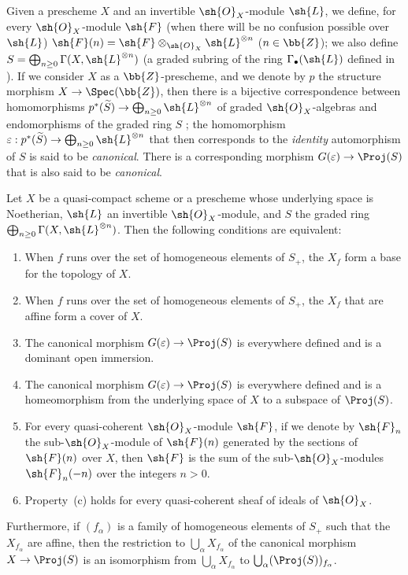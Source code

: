 \begin{env}[4.5.1]
\label{II.4.5.1}
Given a prescheme $X$ and an invertible $\sh{O}_X$-module $\sh{L}$, we define, for every $\sh{O}_X$-module $\sh{F}$ (when there will be no confusion possible over $\sh{L}$) $\sh{F}(n)=\sh{F}\otimes_{\sh{O}_X}\sh{L}^{\otimes n}$ ($n\in\bb{Z}$);
we also define $S=\bigoplus_{n\geq0}\Gamma(X,\sh{L}^{\otimes n})$ (a graded subring of the ring $\Gamma_\bullet(\sh{L})$ defined in ).
If we consider $X$ as a $\bb{Z}$-prescheme, and we denote by $p$ the structure morphism $X\to\Spec(\bb{Z})$, then there is a bijective correspondence between homomorphisms $p^*(\widetilde{S})\to\bigoplus_{n\geq0}\sh{L}^{\otimes n}$ of graded $\sh{O}_X$-algebras and endomorphisms of the graded ring $S$ ;
the homomorphism $\varepsilon:p^*(\widetilde{S})\to\bigoplus_{n\geq0}\sh{L}^{\otimes n}$ that then corresponds to the \emph{identity} automorphism of $S$ is said to be \emph{canonical}.
There is a corresponding  morphism $G(\varepsilon)\to\Proj(S)$ that is also said to be \emph{canonical}.
\end{env}

\begin{theorem}[4.5.2]
\label{II.4.5.2}
Let $X$ be a quasi-compact scheme or a prescheme whose underlying space is Noetherian, $\sh{L}$ an invertible $\sh{O}_X$-module, and $S$ the graded ring $\bigoplus_{n\geq0}\Gamma(X,\sh{L}^{\otimes n})$.
Then the following conditions are equivalent:
\begin{enumerate}
  \item[\rm{(a)}] When $f$ runs over the set of homogeneous elements of $S_+$, the $X_f$ form a base for the topology of $X$.
  \item[\rm{(a')}] When $f$ runs over the set of homogeneous elements of $S_+$, the $X_f$ that are affine form a cover of $X$.
  \item[\rm{(b)}] The canonical morphism $G(\varepsilon)\to\Proj(S)$  is everywhere defined and is a dominant open immersion.
  \item[\rm{(b')}] The canonical morphism $G(\varepsilon)\to\Proj(S)$ is everywhere defined and is a homeomorphism from the underlying space of $X$ to a subspace of $\Proj(S)$.
  \item[\rm{(c)}] For every quasi-coherent $\sh{O}_X$-module $\sh{F}$, if we denote by $\sh{F}_n$ the sub-$\sh{O}_X$-module of $\sh{F}(n)$ generated by the sections of $\sh{F}(n)$ over $X$, then $\sh{F}$ is the sum of the sub-$\sh{O}_X$-modules $\sh{F}_n(-n)$ over the integers $n>0$.
  \item[\rm{(c')}] Property~\rm{(c)} holds for every quasi-coherent sheaf of ideals of $\sh{O}_X$.
\end{enumerate}

Furthermore, if $(f_\alpha)$ is a family of homogeneous elements of $S_+$ such that the $X_{f_\alpha}$ are affine, then the restriction to $\bigcup_\alpha X_{f_\alpha}$ of the canonical morphism $X\to\Proj(S)$ is an isomorphism from $\bigcup_\alpha X_{f_\alpha}$ to $\bigcup_\alpha(\Proj(S))_{f_\alpha}$.
\end{theorem}

